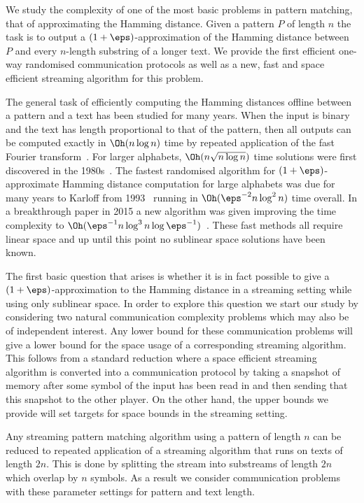 We study the complexity of one of the most basic problems in pattern matching, that of approximating the Hamming distance.  Given a pattern $P$ of length $n$  the task is to output a $(1+\eps)$-approximation of the Hamming distance between $P$ and every $n$-length substring of a longer text. We provide the first efficient one-way randomised communication protocols as well as a new, fast and space efficient streaming algorithm for this problem.  

The general task of efficiently computing the Hamming distances offline between a pattern and a text has been studied for many years.  When the input is binary and the text has length proportional to that of the pattern, then all outputs can be computed exactly in $\Oh (n\log{n})$ time by repeated application of the fast Fourier transform~\cite{FP:1974}. For larger alphabets, $\Oh (n\sqrt{n\log{n}})$ time solutions were first discovered in the 1980s~\cite{Abrahamson:1987,Kosaraju:1987}. The fastest randomised algorithm for $(1+\eps)$-approximate Hamming distance computation for large alphabets was due for many years to Karloff from 1993~\cite{Karloff:1993} running in $\Oh (\eps^{-2} n\log^2{n})$ time overall.  In a breakthrough paper in 2015 a new algorithm was given improving the time complexity to $\Oh (\eps^{-1} n\log^3{n}\log{\eps^{-1}} )$~\cite{KP:2015}.  These fast methods all require linear space and up until this point no sublinear space solutions have been known.

The first basic question that arises is whether it is in fact possible to give a $(1+\eps)$-approximation to the Hamming distance in a streaming setting while using only sublinear space. In order to explore this question we start our study by considering two natural communication complexity problems which may also be of independent interest. Any lower bound for these communication problems will give a lower bound for the space usage of a corresponding streaming algorithm. This follows from a standard reduction where a space efficient streaming algorithm is converted into a communication protocol by taking a snapshot of memory after some symbol of the input has been read in and then sending that this snapshot to the other player. On the other hand, the upper bounds we provide will set targets for space bounds in the streaming setting.

Any streaming pattern matching algorithm using a pattern of length $n$ can be reduced to repeated application of a streaming algorithm that runs on texts of length $2n$. This is done by splitting the stream into substreams of length $2n$ which overlap by $n$ symbols.  As a result we consider communication problems with these parameter settings for pattern and text length.

